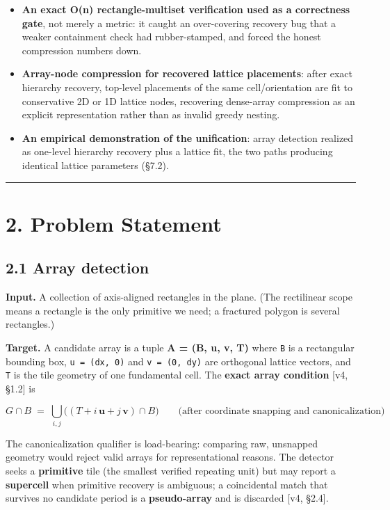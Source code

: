 \documentclass[
  11pt,
]{article}
\begin{document}
\begin{itemize}
  reflections/rotations), so mirrored standard-cell rows recover as one
  cell rather than eight spurious ones.
\item
  \textbf{An exact O(n) rectangle-multiset verification used as a
  correctness gate}, not merely a metric: it caught an over-covering
  recovery bug that a weaker containment check had rubber-stamped, and
  forced the honest compression numbers down.
\item
  \textbf{Array-node compression for recovered lattice placements}:
  after exact hierarchy recovery, top-level placements of the same
  cell/orientation are fit to conservative 2D or 1D lattice nodes,
  recovering dense-array compression as an explicit representation
  rather than as invalid greedy nesting.
\item
  \textbf{An empirical demonstration of the unification}: array
  detection realized as one-level hierarchy recovery plus a lattice fit,
  the two paths producing identical lattice parameters (§7.2).
\end{itemize}

\begin{center}\rule{0.5\linewidth}{0.5pt}\end{center}

\section{2. Problem Statement}\label{problem-statement}

\subsection{2.1 Array detection}\label{array-detection}

\textbf{Input.} A collection of axis-aligned rectangles in the plane.
(The rectilinear scope means a rectangle is the only primitive we need;
a fractured polygon is several rectangles.)

\textbf{Target.} A candidate array is a tuple \textbf{A = (B, u, v, T)}
where \texttt{B} is a rectangular bounding box, \texttt{u\ =\ (dx,\ 0)}
and \texttt{v\ =\ (0,\ dy)} are orthogonal lattice vectors, and
\texttt{T} is the tile geometry of one fundamental cell. The
\textbf{exact array condition} {[}v4, §1.2{]} is

\[G \cap B \;=\; \bigcup_{i,j} \big( (T + i\,\mathbf{u} + j\,\mathbf{v}) \cap B \big)
\qquad\text{(after coordinate snapping and canonicalization)}\]

The canonicalization qualifier is load-bearing: comparing raw, unsnapped
geometry would reject valid arrays for representational reasons. The
detector seeks a \textbf{primitive} tile (the smallest verified
repeating unit) but may report a \textbf{supercell} when primitive
recovery is ambiguous; a coincidental match that survives no candidate
period is a \textbf{pseudo-array} and is discarded {[}v4, §2.4{]}.
\end{document}
